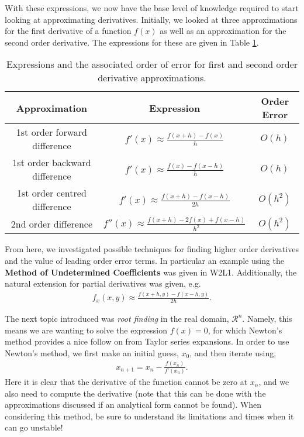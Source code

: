 \documentclass[11pt,a4paper]{report}
\begin{document}
		With these expressions, we now have the base level of knowledge required to start looking at approximating derivatives. Initially, we looked at three approximations for the first derivative of a function $f(x)$ as well as an approximation for the second order derivative. The expressions for these are given in Table \ref{tab:numDerivatives}.
		\begin{table}[h!]
			\caption{Expressions and the associated order of error for first and second order derivative approximations.} \label{tab:numDerivatives}
			\centering
			\begin{tabular}{c c c}
				\hline
				\textbf{Approximation}	&	\textbf{Expression}	& \textbf{Order Error} \\
				\hline
				1st order forward difference & $f'(x) \approx \frac{f(x+h) - f(x)}{h}$ & $O(h)$ \\[5pt]
				1st order backward difference & $f'(x) \approx \frac{f(x) - f(x-h)}{h}$ & $O(h)$ \\[5pt]
				1st order centred difference & $f'(x) \approx \frac{f(x+h) - f(x-h)}{2h}$ & $O(h^2)$ \\[5pt]
				2nd order difference & $f''(x) \approx \frac{f(x+h) - 2f(x) + f(x-h)}{h^2}$ & $O(h^2)$\\[5pt]
				\hline
			\end{tabular}
		\end{table}
	
		From here, we investigated possible techniques for finding higher order derivatives and the value of leading order error terms. In particular an example using the \textbf{Method of Undetermined Coefficients} was given in W2L1. Additionally, the natural extension for partial derivatives was given, e.g.
		\begin{align}
			f_x(x,y) \approx \frac{f(x+h,y) - f(x-h,y)}{2h}.
		\end{align}
		
		The next topic introduced was \textit{root finding} in the real domain, $\mathcal{R}^n$. Namely, this means we are wanting to solve the expression $f(x)=0$, for which Newton's method provides a nice follow on from Taylor series expansions. In order to use Newton's method, we first make an initial guess, $x_0$, and then iterate using,
		\begin{align}
			x_{n+1} = x_n - \frac{f(x_n)}{f'(x_n)}.
		\end{align}
		Here it is clear that the derivative of the function cannot be zero at $x_n$, and we also need to compute the derivative (note that this can be done with the approximations discussed if an analytical form cannot be found). When considering this method, be sure to understand its limitations and times when it can go unstable!
		
\end{document}
